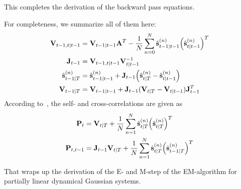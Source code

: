 		This completes the derivation of the backward pass equations.

		For completeness, we summarize all of them here:
		\begin{align}
			\boldsymbol{\mathrm{V}}_{t - 1, t \vert t - 1} &= \boldsymbol{\mathrm{V}}_{t - 1 \vert t - 1} \boldsymbol{\mathrm{A}}^T - \frac{1}{N} \sum_{n = 0}^{N} \hat{\boldsymbol{\mathrm{s}}}_{t - 1 \vert t - 1}^{(n)} \Big(\hat{\boldsymbol{\mathrm{s}}}_{t \vert t - 1}^{(n)}\Big)^T  \nonumber \\
			\boldsymbol{\mathrm{J}}_{t - 1} &= \boldsymbol{\mathrm{V}}_{t - 1, t \vert t - 1} \boldsymbol{\mathrm{V}}_{t \vert t - 1}^{-1}  \nonumber \\
			\hat{\boldsymbol{\mathrm{s}}}_{t - 1 \vert T}^{(n)} &= \hat{\boldsymbol{\mathrm{s}}}_{t - 1 \vert t - 1}^{(n)} + \boldsymbol{\mathrm{J}}_{t - 1} \Big(\hat{\boldsymbol{\mathrm{s}}}_{t \vert T}^{(n)} - \hat{\boldsymbol{\mathrm{s}}}_{t \vert t - 1}^{(n)}\Big)  \label{eq:posteriorMean} \\
			\boldsymbol{\mathrm{V}}_{t - 1 \vert T} &= \boldsymbol{\mathrm{V}}_{t - 1 \vert t - 1} + \boldsymbol{\mathrm{J}}_{t - 1} (\boldsymbol{\mathrm{V}}_{t \vert T} - \boldsymbol{\mathrm{V}}_{t \vert t - 1}) \boldsymbol{\mathrm{J}}_{t - 1}^T  \label{eq:posteriorCov}
		\end{align}
		According to~\cite{minkaBayesianLinearRegression1999}, the self- and cross-correlations are given as
		\begin{align*}
			\boldsymbol{\mathrm{P}}_t &= \boldsymbol{\mathrm{V}}_{t \vert T} + \frac{1}{N} \sum_{n = 1}^{N} \hat{\boldsymbol{\mathrm{s}}}_{t \vert T}^{(n)} \Big(\hat{\boldsymbol{\mathrm{s}}}_{t \vert T}^{(n)}\Big)^T \\
			\boldsymbol{\mathrm{P}}_{t, t - 1} &= \boldsymbol{\mathrm{J}}_{t - 1} \boldsymbol{\mathrm{V}}_{t \vert T} + \frac{1}{N} \sum_{n = 1}^{N} \hat{\boldsymbol{\mathrm{s}}}_{t \vert T}^{(n)} \Big(\hat{\boldsymbol{\mathrm{s}}}_{t - 1 \vert T}^{(n)}\Big)^T
		\end{align*}

		That wraps up the derivation of the E- and M-step of the EM-algorithm for partially linear dynamical Gaussian systems.

